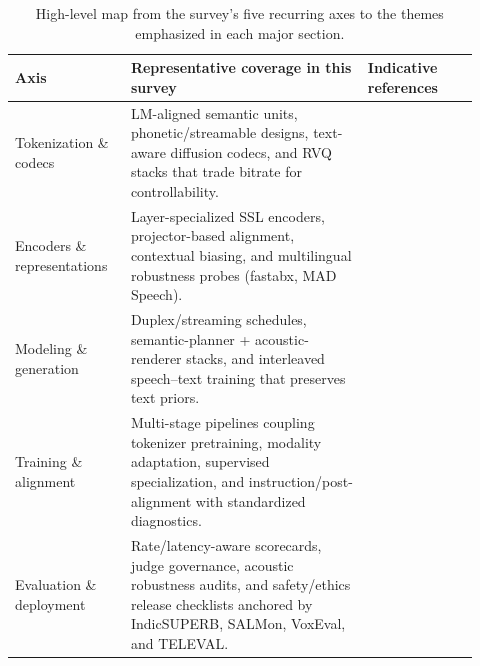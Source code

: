 \begin{table}[ht]
    \centering
    \small
    \setlength{\tabcolsep}{6pt}
    \renewcommand{\arraystretch}{1.25}
    \begin{tabular}{p{0.23\linewidth} p{0.47\linewidth} p{0.22\linewidth}}
        \toprule
        \textbf{Axis} & \textbf{Representative coverage in this survey} & \textbf{Indicative references} \\
        \midrule
        Tokenization \& codecs & LM-aligned semantic units, phonetic/streamable designs, text-aware diffusion codecs, and RVQ stacks that trade bitrate for controllability. & \cite{har-tuv2025pastphoneticacousticspeechtokenizer,li2025continuousspeechtokenizertext,wang2025tadicodectextawarediffusionspeechtokeniz} \\
        Encoders \& representations & Layer-specialized SSL encoders, projector-based alignment, contextual biasing, and multilingual robustness probes (fastabx, MAD Speech). & \cite{labrak2025empiricalanalysisdiscreteunitrepresentat,chiang2025audioawarelargelanguagemodelsasjudgesspe,futeral2025madspeechmeasuresacousticdiversity} \\
        Modeling \& generation & Duplex/streaming schedules, semantic-planner + acoustic-renderer stacks, and interleaved speech--text training that preserves text priors. & \cite{ma2024languagemodelcanlistenwhilespeaking,chiang2025stitchsimultaneousthinkingtalkingchunked,zeng2024scalingspeechtextpretrainingsyntheticint} \\
        Training \& alignment & Multi-stage pipelines coupling tokenizer pretraining, modality adaptation, supervised specialization, and instruction/post-alignment with standardized diagnostics. & \cite{maimon2025scalinganalysisinterleavedspeechtextlang,li2025continuousspeechtokenizertext,vashishth2024stabspeechtokenizerassessmentbenchmark} \\
        Evaluation \& deployment & Rate/latency-aware scorecards, judge governance, acoustic robustness audits, and safety/ethics release checklists anchored by IndicSUPERB, SALMon, VoxEval, and TELEVAL. & \cite{entry2025indicsuperbspeechprocessinguniversalperf,maimon2025salmonsuiteacousticlanguagemodelevaluati,cui2025voxevalbenchmarkingknowledgeunderstandin,li2025televaldynamicbenchmarkdesignedspokenlan} \\
        \bottomrule
    \end{tabular}
    \caption{High-level map from the survey’s five recurring axes to the themes emphasized in each major section.}
    \label{tab:summary_table}
\end{table}
